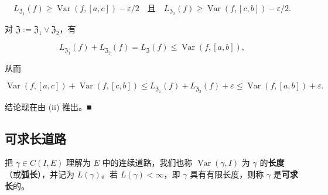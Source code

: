 \begin{lemma}
\begin{subitems}
\[
L_{\mathfrak{Z}_1}(f) \ge \operatorname{Var}(f,[a,c]) - \varepsilon/2 \quad \text{且}\quad L_{\mathfrak{Z}_2}(f) \ge \operatorname{Var}(f,[c,b]) - \varepsilon/2 .
\]

对 $ \mathfrak{Z} := \mathfrak{Z}_1 \vee \mathfrak{Z}_2 $，有

\[
L_{\mathfrak{Z}_1}(f) + L_{\mathfrak{Z}_2}(f) = L_{\mathfrak{Z}}(f) \le \operatorname{Var}(f,[a,b]) ,
\]

从而

\[
\operatorname{Var}(f,[a,c]) + \operatorname{Var}(f,[c,b]) \le L_{\mathfrak{Z}_1}(f) + L_{\mathfrak{Z}_2}(f) + \varepsilon \le \operatorname{Var}(f,[a,b]) + \varepsilon .
\]

结论现在由 (ii) 推出。\nobreak\hspace{0.35em}■

\end{subitems}

\end{lemma}

\subsection*{可求长道路}

把 $ \gamma \in C(I,E) $ 理解为 $ E $ 中的连续道路，我们也称 $ \operatorname{Var}(\gamma,I) $ 为 $ \gamma $ 的\textbf{长度}（或\textbf{弧长}），并记为 $ L(\gamma) $。若 $ L(\gamma) < \infty $，即 $ \gamma $ 具有有限长度，则称 $ \gamma $ 是\textbf{可求长}的。

